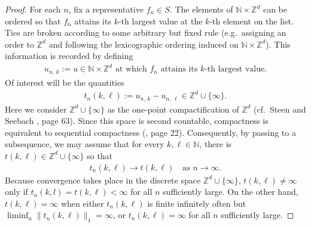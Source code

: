 \documentclass[11pt,reqno]{amsart}
\numberwithin{equation}{section}
\theoremstyle{definition}
\begin{document}
\begin{proof}
For each $n$, fix a representative $f_n \in S$. 
The elements of ${\mathbb{N}} \times {\mathbb{Z}}^d$ can be ordered so that $f_n$ attains its $k$-th largest value at the $k$-th element on the list.
Ties are broken according to some arbitrary but fixed rule (e.g.~assigning an order to ${\mathbb{Z}}^d$ and following the lexicographic ordering induced on ${\mathbb{N}} \times {\mathbb{Z}}^d$).
This information is recorded by defining
{\begin{align*} {
u_{n,\, k} := u \in {\mathbb{N}} \times {\mathbb{Z}}^d \text{ at which $f_n$ attains its $k$-th largest value}.
} \end{align*}}
Of interest will be the quantities
{\begin{align*} {
t_n(k,\ell) := u_{n,\, k} - u_{n,\, \ell} \in {\mathbb{Z}}^d \cup \{\infty\}.
} \end{align*}}
Here we consider ${\mathbb{Z}}^d \cup \{\infty\}$ as the one-point compactification of ${\mathbb{Z}}^d$ (cf.~Steen and Seebach \cite{seebach-steen78}, page 63).
Since this space is second countable, compactness is equivalent to sequential compactness (\cite{seebach-steen78}, page 22).
Consequently, by passing to a subsequence, we may assume that for every $k,\ell \in {\mathbb{N}}$, there is $t(k,\ell) \in {\mathbb{Z}}^d \cup \{\infty\}$ so that
{\begin{align*} {
t_n(k,\ell) \to t(k,\ell) \quad \text{as } n \to \infty.
} \end{align*}}
Because convergence takes place in the discrete space ${\mathbb{Z}}^d \cup \{\infty\}$, $t(k,\ell) \neq \infty$ only if $t_n(k,l) = t(k,\ell) < \infty$ for all $n$ sufficiently large.
On the other hand, $t(k,\ell) = \infty$ when either $t_n(k,\ell)$ is finite infinitely often but $\liminf_n \|t_n(k,\ell)\|_1 = \infty$, or $t_n(k,\ell) = \infty$ for all $n$ sufficiently large.


\end{proof}
\end{document}
